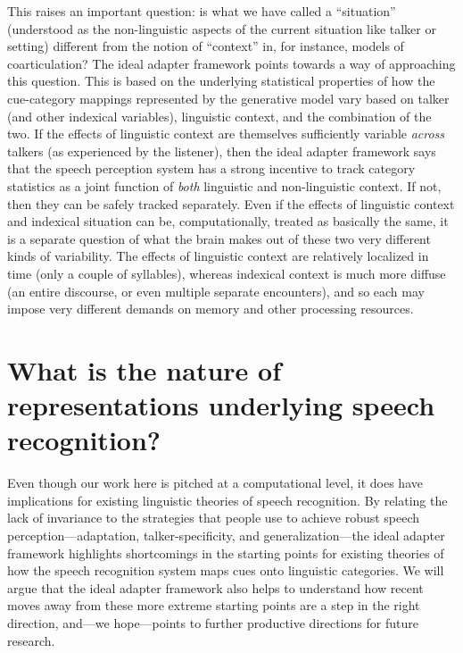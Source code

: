 This raises an important question: is what we have called a ``situation'' (understood as the non-linguistic aspects of the current situation like talker or setting) different from the notion of ``context'' in, for instance, models of coarticulation?  The ideal adapter framework points towards a way of approaching this question.  This is based on the underlying statistical properties of how the cue-category mappings represented by the generative model vary based on talker (and other indexical variables), linguistic context, and the combination of the two.  If the effects of linguistic context are themselves sufficiently variable \emph{across} talkers (as experienced by the listener), then the ideal adapter framework says that the speech perception system has a strong incentive to track category statistics as a joint function of \emph{both} linguistic and non-linguistic context.  If not, then they can be safely tracked separately.  
Even if the effects of linguistic context and indexical situation can be, computationally, treated as basically the same, it is a separate question of what the brain makes out of these two very different kinds of variability.  The effects of linguistic context are relatively localized in time (only a couple of syllables), whereas indexical context is much more diffuse (an entire discourse, or even multiple separate encounters), and so each may impose very different demands on memory and other processing resources.

\label{r2-part3-sec-end}

\section{What is the nature of representations underlying speech recognition?}
\label{sec:ling-theor-speech}
\label{r3-epi-abs}
\label{r1-epi-abs}

Even though our work here is pitched at a computational level, it does have implications for existing linguistic theories of speech recognition.  By relating the lack of invariance to the strategies that people use to achieve robust speech perception---adaptation, talker-specificity, and generalization---the ideal adapter framework highlights shortcomings in the starting points for existing theories of how the speech recognition system maps cues onto linguistic categories.  We will argue that the ideal adapter framework also helps to understand how recent moves away from these more extreme starting points are a step in the right direction, and---we hope---points to further productive directions for future research.


